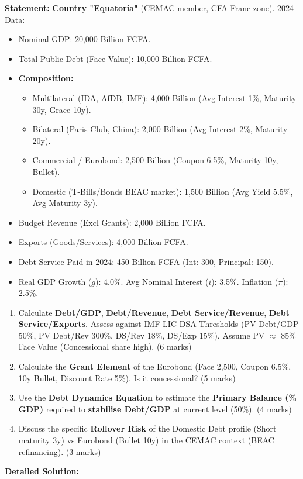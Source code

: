 \documentclass[11pt]{article}
\begin{document}
\begin{exoresolu}
\textbf{Statement:}
\textbf{Country "Equatoria"} (CEMAC member, CFA Franc zone). 2024 Data:
\begin{itemize}
    \item Nominal GDP: 20,000 Billion FCFA.
    \item Total Public Debt (Face Value): 10,000 Billion FCFA.
    \item \textbf{Composition:} 
    \begin{itemize}
        \item Multilateral (IDA, AfDB, IMF): 4,000 Billion (Avg Interest 1\%, Maturity 30y, Grace 10y).
        \item Bilateral (Paris Club, China): 2,000 Billion (Avg Interest 2\%, Maturity 20y).
        \item Commercial / Eurobond: 2,500 Billion (Coupon 6.5\%, Maturity 10y, Bullet).
        \item Domestic (T-Bills/Bonds BEAC market): 1,500 Billion (Avg Yield 5.5\%, Avg Maturity 3y).
    \end{itemize}
    \item Budget Revenue (Excl Grants): 2,000 Billion FCFA.
    \item Exports (Goods/Services): 4,000 Billion FCFA.
    \item Debt Service Paid in 2024: 450 Billion FCFA (Int: 300, Principal: 150).
    \item Real GDP Growth ($g$): 4.0\%. Avg Nominal Interest ($i$): 3.5\%. Inflation ($\pi$): 2.5\%.
\end{itemize}
\begin{enumerate}
    \item Calculate \textbf{Debt/GDP}, \textbf{Debt/Revenue}, \textbf{Debt Service/Revenue}, \textbf{Debt Service/Exports}. Assess against IMF LIC DSA Thresholds (PV Debt/GDP 50\%, PV Debt/Rev 300\%, DS/Rev 18\%, DS/Exp 15\%). Assume PV $\approx$ 85\% Face Value (Concessional share high). (6 marks)
    \item Calculate the \textbf{Grant Element} of the Eurobond (Face 2,500, Coupon 6.5\%, 10y Bullet, Discount Rate 5\%). Is it concessional? (5 marks)
    \item Use the \textbf{Debt Dynamics Equation} to estimate the \textbf{Primary Balance (\% GDP)} required to \textbf{stabilise Debt/GDP} at current level (50\%). (4 marks)
    \item Discuss the specific \textbf{Rollover Risk} of the Domestic Debt profile (Short maturity 3y) vs Eurobond (Bullet 10y) in the CEMAC context (BEAC refinancing). (3 marks)
\end{enumerate}
\tcblower
\textbf{Detailed Solution:}


\end{exoresolu}
\end{document}

